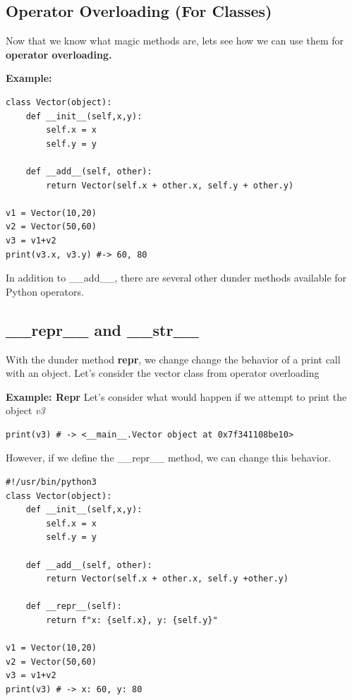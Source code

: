\documentclass{report}
\begin{document}
    \subsection{Operator Overloading (For Classes)}
    \bigbreak \noindent 
    Now that we know what magic methods are, lets see how we can use them for \textbf{operator overloading.}
    \bigbreak \noindent 
    \begin{mdframed}
      \textbf{Example: }
      
      \begin{verbatim}
class Vector(object):
    def __init__(self,x,y):
        self.x = x
        self.y = y

    def __add__(self, other):
        return Vector(self.x + other.x, self.y + other.y)

v1 = Vector(10,20)
v2 = Vector(50,60)
v3 = v1+v2
print(v3.x, v3.y) #-> 60, 80
      \end{verbatim}
    \end{mdframed}
    \bigbreak \noindent 
    In addition to \_\_add\_\_, there are several other dunder methods available for Python operators.

    \subsection{\_\_repr\_\_ and \_\_str\_\_}
    \bigbreak \noindent 
    With the dunder method \textbf{repr}, we change change the behavior of a print call with an object. Let's consider the vector class from operator overloading
    \begin{mdframed}
      \textbf{Example: Repr}
      \bigbreak \noindent 
      Let's consider what would happen if we attempt to print the object \textit{v3}
      \begin{verbatim}
print(v3) # -> <__main__.Vector object at 0x7f341108be10>
      \end{verbatim}
      \bigbreak \noindent 
      However, if we define the \_\_repr\_\_ method, we can change this behavior.
      \begin{verbatim}
#!/usr/bin/python3
class Vector(object):
    def __init__(self,x,y):
        self.x = x
        self.y = y

    def __add__(self, other):
        return Vector(self.x + other.x, self.y +other.y)

    def __repr__(self):
        return f"x: {self.x}, y: {self.y}"

v1 = Vector(10,20)
v2 = Vector(50,60)
v3 = v1+v2
print(v3) # -> x: 60, y: 80
      \end{verbatim}
    \end{mdframed}
    \bigbreak \noindent 
\end{document}
